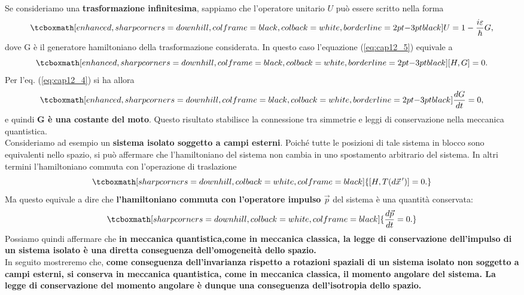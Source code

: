 Se consideriamo una \textbf{trasformazione infinitesima}, sappiamo che l'operatore unitario ${U}$ può essere scritto nella forma 
	\begin{equation}
		\tcboxmath[enhanced, sharp corners=downhill, colframe=black, colback=white, borderline={2pt}{-3pt}{black}]{
			{U}= 1- \frac{i\varepsilon}{\hbar}G,
			}
	\end{equation}
dove G è il generatore hamiltoniano della trasformazione considerata. In questo caso l'equazione (\ref{eq:cap12_5}) equivale a 
	\begin{equation} 
		\tcboxmath[enhanced, sharp corners=downhill, colframe=black, colback=white, borderline={2pt}{-3pt}{black}]{
			[H,G]=0.
			}
	\end{equation}
Per l'eq. (\ref{eq:cap12_4}) si ha allora
	\begin{equation}
		\tcboxmath[enhanced, sharp corners=downhill, colframe=black, colback=white, borderline={2pt}{-3pt}{black}]{
			\frac{dG}{dt}=0,
			}
	\end{equation}
e quindi \textbf{G è una costante del moto}. Questo risultato stabilisce la connessione tra simmetrie e leggi di conservazione nella meccanica quantistica.\\

Consideriamo ad esempio un \textbf{sistema isolato soggetto a campi esterni}. Poiché tutte le posizioni di tale sistema in blocco sono equivalenti nello spazio, si può affermare che l'hamiltoniano del sistema non cambia in uno spostamento arbitrario del sistema. In altri termini l'hamiltoniano commuta con l'operazione di traslazione
	\begin{equation}
		\tcboxmath[sharp corners=downhill, colback=white, colframe=black]{
			[H,T (d\vec{x}^{\, \prime})]=0.
			}
\end{equation}
Ma questo equivale a dire che \textbf{l'hamiltoniano commuta con l'operatore impulso $\vec{p}$} del sistema è una quantità conservata:
	\begin{equation}
		\tcboxmath[sharp corners=downhill, colback=white, colframe=black]{
			\frac{d\vec{p}}{dt}=0.
			}
	\end{equation}
Possiamo quindi affermare che \textbf{in meccanica quantistica,come in meccanica classica, la legge di conservazione dell'impulso di un sistema isolato è una diretta conseguenza dell'omogeneità dello spazio.}\\

In seguito mostreremo che, \textbf{come conseguenza dell'invarianza rispetto a rotazioni spaziali di un sistema isolato non soggetto a campi esterni, si conserva in meccanica quantistica, come in meccanica classica, il momento angolare del sistema. La legge di conservazione del momento angolare è dunque una conseguenza dell'isotropia dello spazio.}\\


